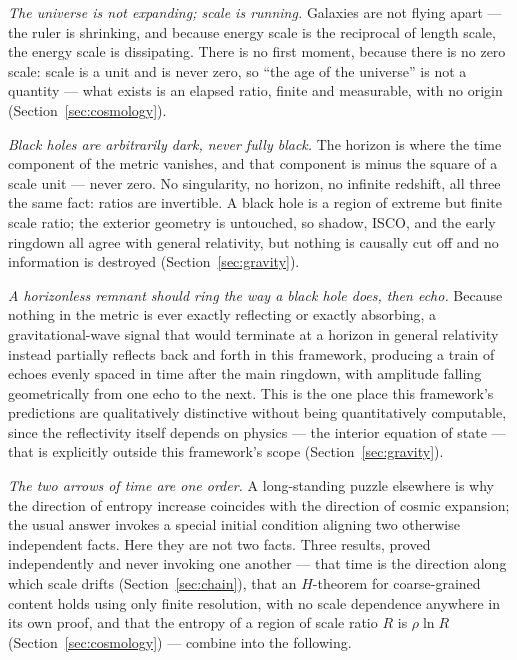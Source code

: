 \documentclass[aps,prd,twocolumn,superscriptaddress,nofootinbib]{revtex4-2}
\begin{document}
\emph{The universe is not expanding; scale is running.} Galaxies are not
flying apart — the ruler is shrinking, and because energy scale is the
reciprocal of length scale, the energy scale is dissipating. There is no
first moment, because there is no zero scale: scale is a unit and is
never zero, so ``the age of the universe'' is not a quantity — what
exists is an elapsed ratio, finite and measurable, with no origin
(Section~\ref{sec:cosmology}).

\emph{Black holes are arbitrarily dark, never fully black.} The horizon
is where the time component of the metric vanishes, and that component
is minus the square of a scale unit — never zero. No singularity, no
horizon, no infinite redshift, all three the same fact: ratios are
invertible. A black hole is a region of extreme but finite scale ratio;
the exterior geometry is untouched, so shadow, ISCO, and the early
ringdown all agree with general relativity, but nothing is causally cut
off and no information is destroyed (Section~\ref{sec:gravity}).

\emph{A horizonless remnant should ring the way a black hole does, then
echo.} Because nothing in the metric is ever exactly reflecting or
exactly absorbing, a gravitational-wave signal that would terminate at a
horizon in general relativity instead partially reflects back and forth
in this framework, producing a train of echoes evenly spaced in time
after the main ringdown, with amplitude falling geometrically from one
echo to the next. This is the one place this framework's predictions are
qualitatively distinctive without being quantitatively computable, since
the reflectivity itself depends on physics — the interior equation of
state — that is explicitly outside this framework's scope
(Section~\ref{sec:gravity}).

\emph{The two arrows of time are one order.} A long-standing puzzle
elsewhere is why the direction of entropy increase coincides with the
direction of cosmic expansion; the usual answer invokes a special
initial condition aligning two otherwise independent facts. Here they
are not two facts. Three results, proved independently and never
invoking one another — that time is the direction along which scale
drifts (Section~\ref{sec:chain}), that an $H$-theorem for coarse-grained
content holds using only finite resolution, with no scale dependence
anywhere in its own proof, and that the entropy of a region of scale
ratio $R$ is $\rho \ln R$ (Section~\ref{sec:cosmology}) — combine into
the following.
\end{document}
